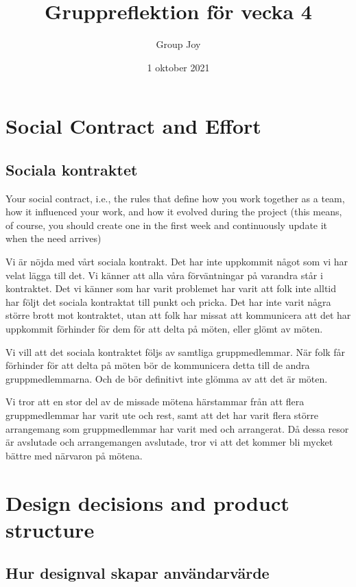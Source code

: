 \documentclass{scrartcl}
\begin{document}
\title{Gruppreflektion för vecka 4}
\author{Group Joy}
\date{1 oktober 2021}
\maketitle

\section{Social Contract and Effort}

\subsection{Sociala kontraktet}

\begin{displayquote}
    Your social contract, i.e., the rules that define how you work together as a team, how it influenced your work, and how it evolved during the project (this means, of course, you should create one in the first week and continuously update it when the need arrives)
\end{displayquote}

Vi är nöjda med vårt sociala kontrakt.
Det har inte uppkommit något som vi har velat lägga till det.
Vi känner att alla våra förväntningar på varandra står i kontraktet.
Det vi känner som har varit problemet har varit att folk inte alltid har följt det sociala kontraktat till punkt och pricka.
Det har inte varit några större brott mot kontraktet, utan att folk har missat att kommunicera att det har uppkommit förhinder för dem för att delta på möten, eller glömt av möten.

Vi vill att det sociala kontraktet följs av samtliga gruppmedlemmar.
När folk får förhinder för att delta på möten bör de kommunicera detta till de andra gruppmedlemmarna.
Och de bör definitivt inte glömma av att det är möten.

Vi tror att en stor del av de missade mötena härstammar från att flera gruppmedlemmar har varit ute och rest, samt att det har varit flera större arrangemang som gruppmedlemmar har varit med och arrangerat.
Då dessa resor är avslutade och arrangemangen avslutade, tror vi att det kommer bli mycket bättre med närvaron på mötena.

\section{Design decisions and product structure}

\subsection{Hur designval skapar användarvärde}
\end{document}
